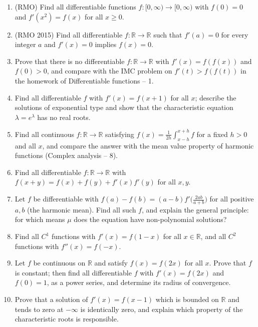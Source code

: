 \documentclass[11pt,a4paper]{article}
\renewcommand{\ge}{\geqslant}
\begin{document}
\begin{enumerate}[leftmargin=2.2em,itemsep=0.6em]
\item (RMO) Find all differentiable functions $f\colon[0,\infty)\to[0,\infty)$ with $f(0)=0$ and
$f'(x^2)=f(x)$ for all $x\ge0$.

\item (RMO 2015) Find all differentiable $f\colon\mathbb R\to\mathbb R$ such that $f'(a)=0$ for every
integer $a$ and $f'(x)=0$ implies $f(x)=0$.

\item Prove that there is no differentiable $f\colon\mathbb R\to\mathbb R$ with $f'(x)=f(f(x))$ and
$f(0)>0$, and compare with the IMC problem on $f'(t)>f(f(t))$ in the homework of Differentiable
functions -- 1.

\item Find all differentiable $f$ with $f'(x)=f(x+1)$ for all $x$; describe the solutions of exponential
type and show that the characteristic equation $\lambda=e^\lambda$ has no real roots.

\item Find all continuous $f\colon\mathbb R\to\mathbb R$ satisfying $f(x)=\frac1{2h}\int_{x-h}^{x+h}f$
for a fixed $h>0$ and all $x$, and compare the answer with the mean value property of harmonic functions
(Complex analysis -- 8).

\item Find all differentiable $f\colon\mathbb R\to\mathbb R$ with $f(x+y)=f(x)+f(y)+f'(x)f'(y)$ for all
$x,y$.

\item Let $f$ be differentiable with $f(a)-f(b)=(a-b)f'\bigl(\frac{2ab}{a+b}\bigr)$ for all positive
$a,b$ (the harmonic mean). Find all such $f$, and explain the general principle: for which means $\mu$
does the equation have non-polynomial solutions?

\item Find all $C^1$ functions with $f'(x)=f(1-x)$ for all $x\in\mathbb R$, and all $C^2$ functions with
$f''(x)=f(-x)$.

\item Let $f$ be continuous on $\mathbb R$ and satisfy $f(x)=f(2x)$ for all $x$. Prove that $f$ is
constant; then find all differentiable $f$ with $f'(x)=f(2x)$ and $f(0)=1$, as a power series, and
determine its radius of convergence.

\item Prove that a solution of $f'(x)=f(x-1)$ which is bounded on $\mathbb R$ and tends to zero at
$-\infty$ is identically zero, and explain which property of the characteristic roots is responsible.
\end{enumerate}
\end{document}

